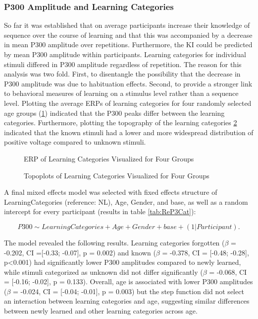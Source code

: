 \subsubsection{P300 Amplitude and Learning Categories}
So far it was established that on average participants increase their knowledge of sequence over the course of learning and that this was accompanied by a decrease in mean P300 amplitude over repetitions. Furthermore, the KI could be predicted by mean P300 amplitude within participants. Learning categories for individual stimuli differed in P300 amplitude regardless of repetition. The reason for this analysis was two fold. First, to disentangle the possibility that the decrease in P300 amplitude was due to habituation effects. Second, to provide a stronger link to behavioral measures of learning on a stimulus level rather than a sequence level. Plotting the average ERPs of learning categories for four randomly selected age groups (\ref{fig:erp_ls}) indicated that the P300 peaks differ between the learning categories. Furthermore, plotting the topography of the learning categories \ref{fig:topo} indicated that the known stimuli had a lower and more widespread distribution of positive voltage compared to unknown stimuli.
\begin{figure}[H]
    \centering
       
    \caption{ERP of Learning Categories Visualized for Four Groups}
    \label{fig:erp_ls}
\end{figure}


\begin{figure}[H]
     \centering
        
    \caption{Topoplots of Learning Categories Visualized for Four Groups}
    \label{fig:topo}
\end{figure}
\newpage
A final mixed effects model was selected with fixed effects structure of LearningCategories (reference: NL), Age, Gender, and base, as well as a random intercept for every participant (results in table \ref{tab:ReP3Cat}):   

\begin{equation}\label{eq:mCat2}
P300 \sim LearningCategories +  Age + Gender + base + (1 | Participant).
\end{equation}

The model revealed the following results.
Learning categories forgotten ($\beta$ = -0.202, CI  =[-0.33; -0.07], p = 0.002) and known ($\beta$ = -0.378, CI = [-0.48; -0.28], p<0.001) had significantly lower P300 amplitudes compared to newly learned, while stimuli categorized as unknown did not differ significantly ($\beta$ = -0.068, CI = [-0.16; -0.02], p = 0.133). Overall, age is associated with lower P300 amplitudes ($\beta$ = -0.024, CI = [-0.04; -0.01], p = 0.003) but the step function did not select an interaction between learning categories and age, suggesting similar differences between newly learned and other learning categories across age. 

